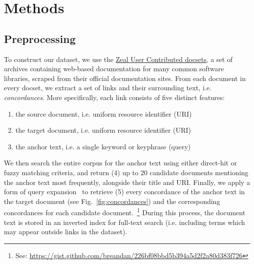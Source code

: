 \documentclass[sigconf,authordraft]{acmart}
\begin{document}
\section{Methods}

\subsection{Preprocessing}\label{subsec:preprocessing}

To construct our dataset, we use the \href{https://zealusercontributions.herokuapp.com/}{Zeal User Contributed docsets}, a set of archives containing web-based documentation for many common software libraries, scraped from their official documentation sites. From each document in every docset, we extract a set of links and their surrounding text, i.e. \textit{concordances}. More specifically, each link consists of five distinct features:

\begin{enumerate}
    \item the source document, i.e. uniform resource identifier (URI)
    \item the target document, i.e. uniform resource identifier (URI)
    \item the anchor text, i.e. a single keyword or keyphrase (query)
\end{enumerate}

We then search the entire corpus for the anchor text using either direct-hit or fuzzy matching criteria, and return (4) up to 20 candidate documents mentioning the anchor text most frequently, alongside their title and URI. Finally, we apply a form of query expansion~\citep{efthimiadis1996query} to retrieve (5) every concordance of the anchor text in the target document (see Fig.~\ref{fig:concordances}) and the corresponding concordances for each candidate document.~\footnote{See: \href{https://gist.github.com/breandan/226bf08bbd5b394a5d2f2a80d383f726}{https://gist.github.com/breandan/226bf08bbd5b394a5d2f2a80d383f726}} During this process, the document text is stored in an inverted index for full-text search (i.e. including terms which may appear outside links in the dataset).
\end{document}
